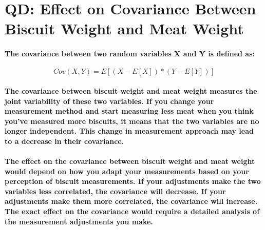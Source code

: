\documentclass[11pt]{article} %
\begin{document}
\section{QD: Effect on Covariance Between Biscuit Weight and Meat Weight}
\paragraph{The covariance between two random variables X and Y is defined as:}
$$ Cov(X, Y) = E[(X - E[X]) * (Y - E[Y])] $$

\paragraph{The covariance between biscuit weight and meat weight measures the joint variability of these two variables. If you change your measurement method and start measuring less meat when you think you've measured more biscuits, it means that the two variables are no longer independent. This change in measurement approach may lead to a decrease in their covariance.}
\paragraph{The effect on the covariance between biscuit weight and meat weight would depend on how you adapt your measurements based on your perception of biscuit measurements. If your adjustments make the two variables less correlated, the covariance will decrease. If your adjustments make them more correlated, the covariance will increase. The exact effect on the covariance would require a detailed analysis of the measurement adjustments you make.}
\end{document}
